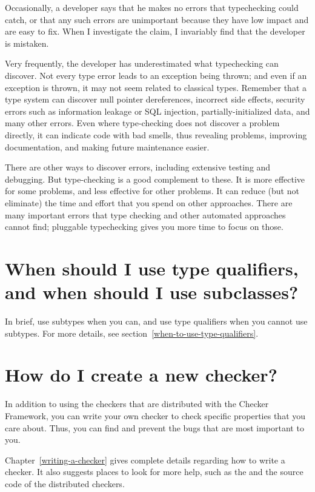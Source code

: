 Occasionally, a developer says that he makes no errors that typechecking
could catch, or that any such errors are unimportant because they have low
impact and are easy to fix.  When I investigate the claim, I invariably
find that the developer is mistaken.

Very frequently, the developer has underestimated what typechecking can
discover.  Not every type error leads to an exception being thrown; and
even if an exception is thrown, it may not seem related to classical types.
Remember that a type system can discover
null pointer dereferences,
incorrect side effects, 
security errors such as information leakage or SQL injection,
partially-initialized data,
and many other errors.  Even where type-checking does not discover a
problem directly, it can indicate code with bad smells, thus revealing
problems, improving documentation, and making future maintenance easier.

There are other ways to discover errors, including extensive testing and
debugging.  But type-checking is a good complement to these.  It is more
effective for some problems, and less effective for other problems.  It can
reduce (but not eliminate) the time and effort that you spend on other
approaches.  There are many important errors that type checking and other
automated approaches cannot find; pluggable typechecking gives you more
time to focus on those.


\section{When should I use type qualifiers, and when should I use subclasses?\label{faq-qualifiers-vs-subclasses}}

In brief, use subtypes when you can, and use type qualifiers when you cannot
use subtypes.
For more details, see section~\ref{when-to-use-type-qualifiers}.


\section{How do I create a new checker?\label{faq-create-a-checker}}

In addition to using the checkers that are distributed with the Checker
Framework, you can write your own checker to check specific properties that
you care about.  Thus, you can find and prevent the bugs that are most
important to you.

Chapter~\ref{writing-a-checker} gives
complete details regarding how to write a checker.  It also suggests places
to look for more help, such as the  and the source code of the distributed
checkers.

